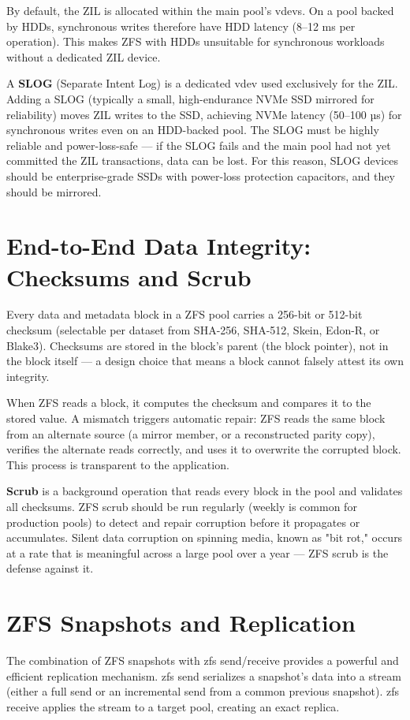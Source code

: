 By default, the ZIL is allocated within the main pool's vdevs. On a pool backed by HDDs, synchronous writes therefore have HDD latency (8--12 ms per operation). This makes ZFS with HDDs unsuitable for synchronous workloads without a dedicated ZIL device.

A \textbf{SLOG} (Separate Intent Log) is a dedicated vdev used exclusively for the ZIL. Adding a SLOG (typically a small, high-endurance NVMe SSD mirrored for reliability) moves ZIL writes to the SSD, achieving NVMe latency (50--100 µs) for synchronous writes even on an HDD-backed pool. The SLOG must be highly reliable and power-loss-safe --- if the SLOG fails and the main pool had not yet committed the ZIL transactions, data can be lost. For this reason, SLOG devices should be enterprise-grade SSDs with power-loss protection capacitors, and they should be mirrored.

\section{End-to-End Data Integrity: Checksums and Scrub}
Every data and metadata block in a ZFS pool carries a 256-bit or 512-bit checksum (selectable per dataset from SHA-256, SHA-512, Skein, Edon-R, or Blake3). Checksums are stored in the block's parent (the block pointer), not in the block itself --- a design choice that means a block cannot falsely attest its own integrity.

When ZFS reads a block, it computes the checksum and compares it to the stored value. A mismatch triggers automatic repair: ZFS reads the same block from an alternate source (a mirror member, or a reconstructed parity copy), verifies the alternate reads correctly, and uses it to overwrite the corrupted block. This process is transparent to the application.

\textbf{Scrub} is a background operation that reads every block in the pool and validates all checksums. ZFS scrub should be run regularly (weekly is common for production pools) to detect and repair corruption before it propagates or accumulates. Silent data corruption on spinning media, known as "bit rot," occurs at a rate that is meaningful across a large pool over a year --- ZFS scrub is the defense against it.

\section{ZFS Snapshots and Replication}
The combination of ZFS snapshots with zfs send/receive provides a powerful and efficient replication mechanism. zfs send serializes a snapshot's data into a stream (either a full send or an incremental send from a common previous snapshot). zfs receive applies the stream to a target pool, creating an exact replica.

